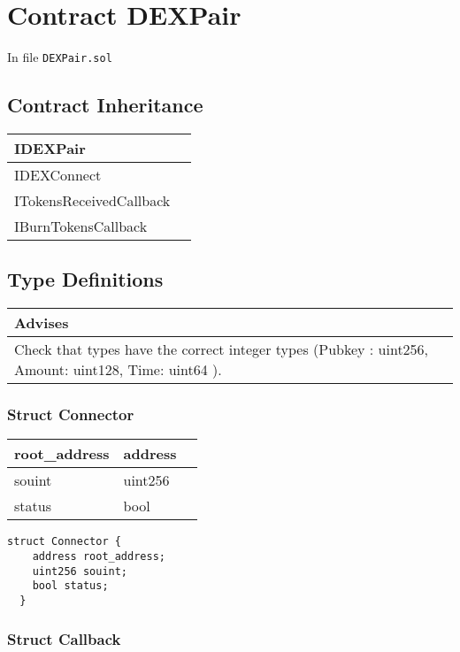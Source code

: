 
\chapter{Contract DEXPair}


In file {\tt DEXPair.sol}

\section{Contract Inheritance}


\noindent\begin{tabular}{|l|p{5cm}|}\hline
IDEXPair & \\\hline
IDEXConnect & \\\hline
ITokensReceivedCallback & \\\hline
IBurnTokensCallback & \\\hline
\end{tabular}


\section{Type Definitions}


\ifsoldraft
\noindent\begin{tabular}{|p{12cm}|}\hline
\rowcolor{green}Advises
\\\hline
Check that types have the correct integer types (Pubkey : uint256, Amount: uint128, Time: uint64 ).
\\\hline\end{tabular}
\fi

\subsection{Struct Connector}


\ifsoltables
\noindent\begin{tabular}{|l|l|p{6cm}|}\hline
root\_{}address & address & \\\hline
souint & uint256 & \\\hline
status & bool & \\\hline
\end{tabular}
\fi


\begin{lstlisting}[firstnumber=37]
  struct Connector {
    address root_address;
    uint256 souint;
    bool status;
  }
\end{lstlisting}

\subsection{Struct Callback}


